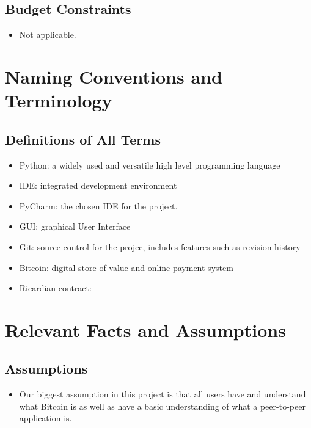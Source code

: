 \documentclass{article}
\begin{document}
\subsection{Budget Constraints}
\begin{itemize}
	
\item
Not applicable.
	
\end{itemize}

\section{Naming Conventions and Terminology}
\subsection{Definitions of All Terms}
\begin{itemize}
	
\item
Python: a widely used and versatile high level programming language
\item
IDE: integrated development environment
\item
PyCharm: the chosen IDE for the project.	
\item
GUI: graphical User Interface
\item
Git: source control for the projec, includes features such as revision history
\item
Bitcoin: digital store of value and online payment system
\item
Ricardian contract: 

\end{itemize}

\section{Relevant Facts and Assumptions}


\subsection{Assumptions}
\begin{itemize}
	
\item
Our biggest assumption in this project is that all users have and understand what Bitcoin is as well as have a basic understanding of what a peer-to-peer application is.
\end{itemize}
\end{document}
